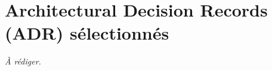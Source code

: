 \chapter{Architectural Decision Records (ADR) s\'electionn\'es}\label{annexe:adr}


\textit{\`A r\'ediger.}
